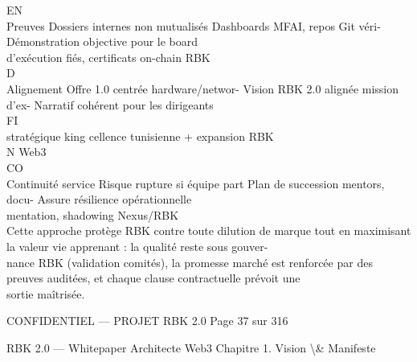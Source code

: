 \documentclass[12pt,landscape,a4paper]{article}
\newenvironment{confidential}
{\begin{tcolorbox}[
    colback=rbkred!5!white,
    colframe=rbkred!75!black,
    title=CONFIDENTIEL,
    fonttitle=\bfseries\color{white},
    coltitle=rbkred!75!black,
    breakable,
    enhanced,
    frame hidden,
    borderline west={2pt}{0pt}{rbkred!75!black}
]}
{\end{tcolorbox}}
\begin{document}
EN\\
Preuves              Dossiers internes non mutualisés    Dashboards MFAI, repos Git véri- Démonstration objective pour le board\\
d’exécution                                              fiés, certificats on-chain       RBK\\
\vspace{0.5em}
\vspace{0.5em}
\vspace{0.5em}
\vspace{0.5em}
D\\
Alignement           Offre 1.0 centrée hardware/networ- Vision RBK 2.0 alignée mission d’ex- Narratif cohérent pour les dirigeants\\
\vspace{0.5em}
\vspace{0.5em}
\vspace{0.5em}
\vspace{0.5em}
FI\\
stratégique          king                               cellence tunisienne + expansion RBK\\
\vspace{0.5em}
N         Web3\\
CO\\
Continuité service   Risque rupture si équipe part       Plan de succession mentors, docu- Assure résilience opérationnelle\\
mentation, shadowing Nexus/RBK\\
\vspace{0.5em}
\vspace{0.5em}
Cette approche protège RBK contre toute dilution de marque tout en maximisant la valeur vie apprenant : la qualité reste sous gouver-\\
nance RBK (validation comités), la promesse marché est renforcée par des preuves auditées, et chaque clause contractuelle prévoit une\\
sortie maîtrisée.\\
\vspace{0.5em}
\vspace{0.5em}
\vspace{0.5em}
\vspace{0.5em}
\begin{confidential}CONFIDENTIEL — PROJET RBK 2.0                               Page 37 sur 316\end{confidential}
RBK 2.0 — Whitepaper Architecte Web3                                                                        Chapitre 1. Vision \textbackslash{}& Manifeste\\
\end{document}
